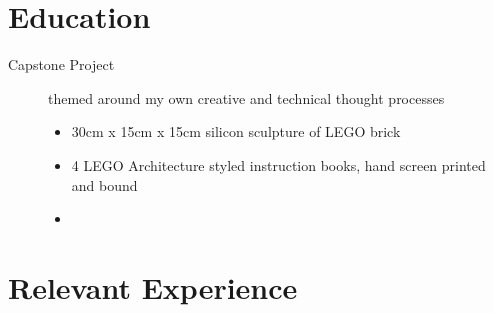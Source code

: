 \documentclass[a4paper]{deedy-resume} %
\begin{document}
    
    
    
    
    
    \section{Education}
    

    \begin{description}
        \item[Capstone Project] themed around my own creative and technical thought processes
        \begin{itemize}
            \item 30cm x 15cm x 15cm silicon sculpture of LEGO brick
            \item 4 LEGO Architecture styled instruction books, hand screen printed and bound
            \item 
        \end{itemize}
    \end{description}
    
    \sectionspace %


    \section{Relevant Experience}
\end{document}
